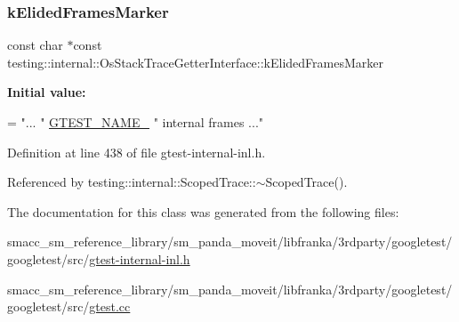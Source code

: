 \subsubsection{\texorpdfstring{k\+Elided\+Frames\+Marker}{kElidedFramesMarker}}
{\footnotesize\ttfamily const char $\ast$const testing\+::internal\+::\+Os\+Stack\+Trace\+Getter\+Interface\+::k\+Elided\+Frames\+Marker\hspace{0.3cm}{\ttfamily [static]}}

{\bfseries Initial value\+:}
\begin{DoxyCode}
=
    \textcolor{stringliteral}{"... "} \hyperlink{gtest-port_8h_a13d98c217176bd8722c395b9225fc19d}{GTEST\_NAME\_} \textcolor{stringliteral}{" internal frames ..."}
\end{DoxyCode}


Definition at line 438 of file gtest-\/internal-\/inl.\+h.



Referenced by testing\+::internal\+::\+Scoped\+Trace\+::$\sim$\+Scoped\+Trace().



The documentation for this class was generated from the following files\+:\begin{DoxyCompactItemize}
\item 
smacc\+\_\+sm\+\_\+reference\+\_\+library/sm\+\_\+panda\+\_\+moveit/libfranka/3rdparty/googletest/googletest/src/\hyperlink{gtest-internal-inl_8h}{gtest-\/internal-\/inl.\+h}\item 
smacc\+\_\+sm\+\_\+reference\+\_\+library/sm\+\_\+panda\+\_\+moveit/libfranka/3rdparty/googletest/googletest/src/\hyperlink{gtest_8cc}{gtest.\+cc}\end{DoxyCompactItemize}
